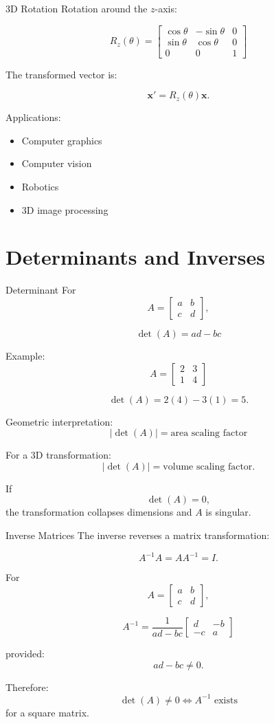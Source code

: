 \documentclass[aspectratio=169]{beamer}
\begin{document}
\begin{frame}{3D Rotation}
Rotation around the $z$-axis:

\[
R_z(\theta)=
\begin{bmatrix}
\cos\theta&-\sin\theta&0\\
\sin\theta&\cos\theta&0\\
0&0&1
\end{bmatrix}
\]

The transformed vector is:

\[
\mathbf x'=R_z(\theta)\mathbf x.
\]

Applications:
\begin{itemize}
\item Computer graphics
\item Computer vision
\item Robotics
\item 3D image processing
\end{itemize}
\end{frame}

\section{Determinants and Inverses}

\begin{frame}{Determinant}
For
\[
A=
\begin{bmatrix}
a&b\\c&d
\end{bmatrix},
\]

\[
\boxed{\det(A)=ad-bc}
\]

Example:
\[
A=
\begin{bmatrix}
2&3\\1&4
\end{bmatrix}
\]

\[
\det(A)=2(4)-3(1)=5.
\]

Geometric interpretation:
\[
|\det(A)|=\text{area scaling factor}
\]

For a 3D transformation:
\[
|\det(A)|=\text{volume scaling factor}.
\]

If
\[
\det(A)=0,
\]
the transformation collapses dimensions and $A$ is singular.
\end{frame}

\begin{frame}{Inverse Matrices}
The inverse reverses a matrix transformation:

\[
A^{-1}A=AA^{-1}=I.
\]

For
\[
A=
\begin{bmatrix}a&b\\c&d\end{bmatrix},
\]

\[
A^{-1}
=
\frac{1}{ad-bc}
\begin{bmatrix}
d&-b\\-c&a
\end{bmatrix}
\]

provided:
\[
ad-bc\neq0.
\]

Therefore:
\[
\boxed{\det(A)\neq0\iff A^{-1}\text{ exists}}
\]
for a square matrix.
\end{frame}
\end{document}
